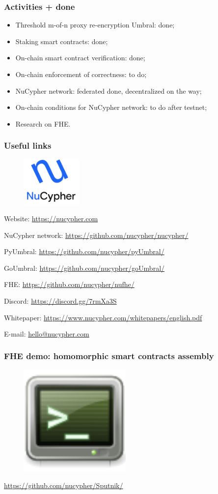 \documentclass[xetex,mathsans,sans,aspectratio=169]{beamer}
\begin{document}
    \begin{frame}
        \frametitle{Activities + done}
        \begin{itemize}
            \item Threshold m-of-n proxy re-encryption Umbral: done;
            \item Staking smart contracts: done;
            \item On-chain smart contract verification: done;
            \item On-chain enforcement of correctness: to do;
            \item NuCypher network: federated done, decentralized on the way;
            \item On-chain conditions for NuCypher network: to do after testnet;
            \item Research on FHE.
        \end{itemize}
    \end{frame}

    \begin{frame}
        \frametitle{Useful links}
        \begin{figure}
            \centering
            \includegraphics[width=3cm]{pdf/nucypher_logo.pdf}
        \end{figure}
        Website: \url{https://nucypher.com}

        NuCypher network: \url{https://github.com/nucypher/nucypher/}

        PyUmbral: \url{https://github.com/nucypher/pyUmbral/}

        GoUmbral: \url{https://github.com/nucypher/goUmbral/}

        FHE: \url{https://github.com/nucypher/nufhe/}

        Discord: \url{https://discord.gg/7rmXa3S}

        Whitepaper: \url{https://www.nucypher.com/whitepapers/english.pdf}

        E-mail: \url{hello@nucypher.com}
    \end{frame}

    \begin{frame}
        \frametitle{FHE demo: homomorphic smart contracts assembly}
        \begin{figure}
            \centering
            \includegraphics[height=5.5cm]{pdf/terminal.pdf}
        \end{figure}
        \url{https://github.com/nucypher/Sputnik/}
    \end{frame}
\end{document}
